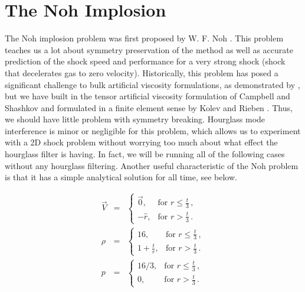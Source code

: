 \section{The Noh Implosion}
The Noh implosion problem was first proposed by W. F. Noh \cite{Noh87}. This problem teaches us a lot about symmetry preservation of the method as well as accurate prediction of the shock speed and performance for a very strong shock (shock that decelerates gas to zero velocity). Historically, this problem has posed a significant challenge to bulk artificial viscosity formulations, as demonstrated by , but we have built in the tensor artificial viscosity formulation of Campbell and Shashkov \cite{CampbellShashkov01} and formulated in a finite element sense by Kolev and Rieben \cite{KolevRieben09}. Thus, we should have little problem with symmetry breaking. Hourglass mode interference is minor or negligible for this problem, which allows us to experiment with a 2D shock problem without worrying too much about what effect the hourglass filter is having. In fact, we will be running all of the following cases without any hourglass filtering. Another useful characteristic of the Noh problem is that it has a simple analytical solution for all time, see below.

\begin{eqnarray*}
\vec V &=& \begin{cases}
\vec 0, &\text{for~}r\leq \frac{t}{3}\,, \\
-\hat r, &\text{for~}r > \frac{t}{3}\,.
\end{cases} \\
\rho &=& \begin{cases}
16, &\text{for~}r\leq \frac{t}{3}\,,\\
1 + \frac{t}{r}, &\text{for~}r > \frac{t}{3}\,.
\end{cases} \label{eq:NohAnalytical}\\
p &=& \begin{cases}
16/3, &\text{for~}r\leq \frac{t}{3}\,, \\
0, &\text{for~}r > \frac{t}{3}\,.
\end{cases} \\
\end{eqnarray*}


